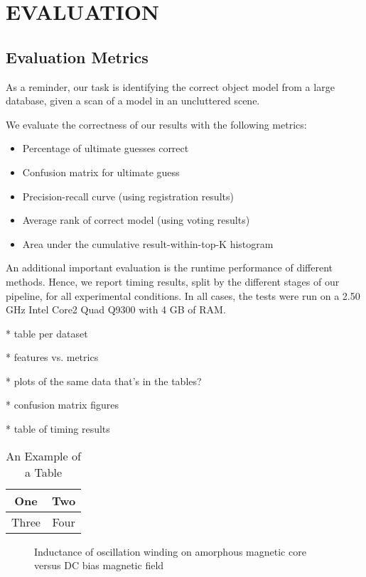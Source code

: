 \section{EVALUATION}

\subsection{Evaluation Metrics}
As a reminder, our task is identifying the correct object model from a large database, given a scan of a model in an uncluttered scene.

We evaluate the correctness of our results with the following metrics:
\begin{itemize}
  \item Percentage of ultimate guesses correct
  \item Confusion matrix for ultimate guess
  \item Precision-recall curve (using registration results)
  \item Average rank of correct model (using voting results)
  \item Area under the cumulative result-within-top-K histogram
\end{itemize}

An additional important evaluation is the runtime performance of different methods.
Hence, we report timing results, split by the different stages of our pipeline, for all experimental conditions.
In all cases, the tests were run on a 2.50 GHz Intel Core2 Quad Q9300 with 4 GB of RAM.

* table per dataset

* features vs. metrics

* plots of the same data that's in the tables?

* confusion matrix figures

* table of timing results

\begin{table}
\caption{An Example of a Table}
\label{table_example}
\begin{center}
\begin{tabular}{|c||c|}
\hline
One & Two\\
\hline
Three & Four\\
\hline
\end{tabular}
\end{center}
\end{table}

\begin{figure}[thpb]
   \centering
   \caption{Inductance of oscillation winding on amorphous
    magnetic core versus DC bias magnetic field}
   \label{figurelabel}
\end{figure}
